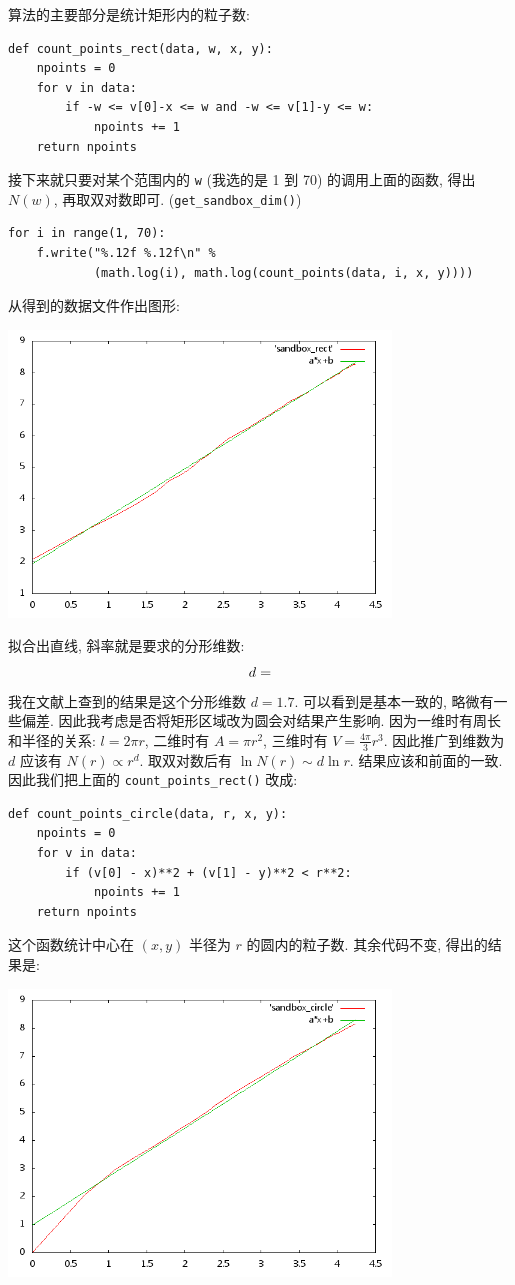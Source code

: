\documentclass{ctexart}
\begin{document}
算法的主要部分是统计矩形内的粒子数:
\begin{verbatim}
def count_points_rect(data, w, x, y):
    npoints = 0
    for v in data:
        if -w <= v[0]-x <= w and -w <= v[1]-y <= w:
            npoints += 1
    return npoints
\end{verbatim}
接下来就只要对某个范围内的 \verb|w| (我选的是 1 到 70) 的调用上面的函数,
得出 $N(w)$, 再取双对数即可. (\verb|get_sandbox_dim()|)
\begin{verbatim}
for i in range(1, 70):
    f.write("%.12f %.12f\n" %
            (math.log(i), math.log(count_points(data, i, x, y))))
\end{verbatim}
从得到的数据文件作出图形:
\begin{center}
\includegraphics[width=4in]{sandbox_rect.png}
\end{center}
拟合出直线, 斜率就是要求的分形维数:
\[
d = \relax
\]
我在文献上查到的结果是这个分形维数 $d=1.7$. 可以看到是基本一致的, 略微有一些偏差.
因此我考虑是否将矩形区域改为圆会对结果产生影响. 因为一维时有周长和半径的关系:
$l = 2\pi r$, 二维时有 $A = \pi r^2$, 三维时有 $V = \frac{4\pi}{3}r^3$.
因此推广到维数为 $d$ 应该有 $N(r)\propto r^d$. 取双对数后有 $\ln N(r) \sim
d\ln r$. 结果应该和前面的一致. 因此我们把上面的 \verb|count_points_rect()| 改成:
\begin{verbatim}
def count_points_circle(data, r, x, y):
    npoints = 0
    for v in data:
        if (v[0] - x)**2 + (v[1] - y)**2 < r**2:
            npoints += 1
    return npoints
\end{verbatim}
这个函数统计中心在 $(x,y)$ 半径为 $r$ 的圆内的粒子数. 其余代码不变, 得出的结果是:
\begin{center}
\includegraphics[width=4in]{sandbox_circle.png}
\end{center}
\end{document}
